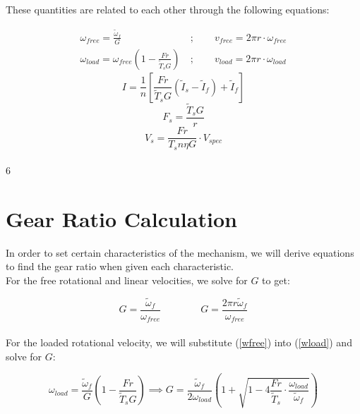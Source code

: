 \documentclass[a4paper]{article}
\begin{document}
	These quantities are related to each other through the following equations:
	
	\begin{align}
		\omega_{free} = \frac{\widetilde{\omega}_f}{G}\ &; \qquad v_{free} = 2\pi r \cdot \omega_{free} \label{wfree} \\
		\omega_{load} = \omega_{free} \left( 1 - \frac{F r}{\widetilde{T}_s G} \right)\ &; \qquad v_{load} = 2\pi r \cdot \omega_{load} \label{wload}
	\end{align}
	\begin{equation} \label{current}
		I = \frac{1}{n} \left[ \frac{F r}{\widetilde{T}_s G} \left( \widetilde{I}_s - \widetilde{I}_f \right) + \widetilde{I}_f \right]
	\end{equation}
	\begin{equation} \label{Fs}
		F_s = \frac{\widetilde{T}_s G}{r}
	\end{equation}
	\begin{equation} \label{Vs}
		V_s = \frac{F r}{T_s n \eta G} \cdot V_{spec}
	\end{equation}\\6
	
	
	\section{Gear Ratio Calculation}
	
	In order to set certain characteristics of the mechanism, we will derive equations to find the gear ratio when given each characteristic.\\
	
	For the free rotational and linear velocities, we solve for $ G $ to get:
	
	\begin{equation}
		G = \frac{\widetilde{\omega}_f}{\omega_{free}} \qquad\qquad G = \frac{2\pi r \widetilde{\omega}_f}{\omega_{free}}
	\end{equation}\\
	
	For the loaded rotational velocity, we will substitute (\ref{wfree}) into (\ref{wload}) and solve for $ G $:
	
	\begin{equation}
		\omega_{load} = \frac{\widetilde{\omega}_f}{G} \left( 1 - \frac{F r}{\widetilde{T}_s G} \right) \implies
		G = \frac{\widetilde{\omega}_f}{2 \omega_{load}} \left( 1 + \sqrt{1 - 4 \frac{F r}{\widetilde{T}_s} \cdot \frac{\omega_{load}}{\widetilde{\omega}_f}} \right)
	\end{equation}\\
	
\end{document}
